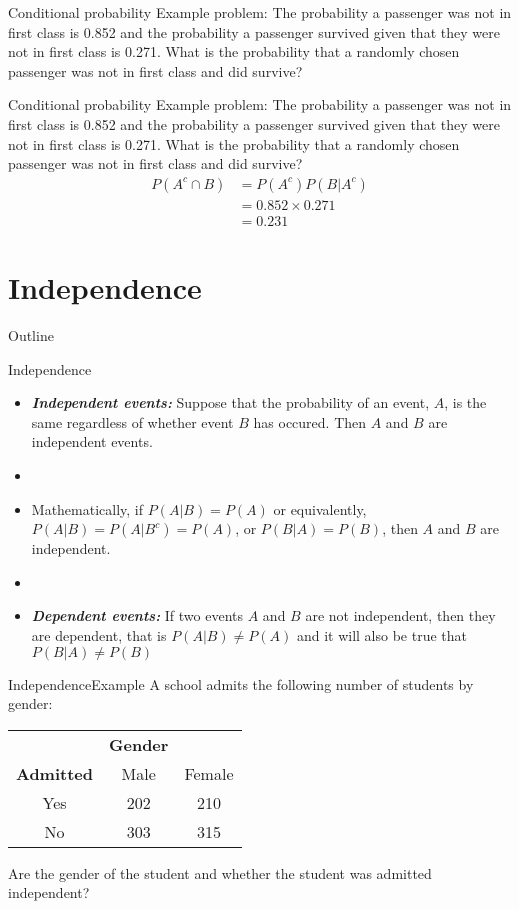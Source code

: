 \documentclass[xcolor=dvipsnames]{beamer}
\begin{document}
\begin{frame}{Conditional probability}
Example problem: The probability a passenger was not in first class is 0.852 and the probability a passenger survived given that they were not in first class is 0.271. What is the probability that a randomly chosen passenger was not in first class and did survive?
\end{frame}

\begin{frame}{Conditional probability}
	Example problem: The probability a passenger was not in first class is 0.852 and the probability a passenger survived given that they were not in first class is 0.271. What is the probability that a randomly chosen passenger was not in first class and did survive?
	\begin{align*}
		P(A^c \cap B) &= P(A^c) P(B|A^c) \\
		&= 0.852 \times 0.271 \\
		&= 0.231
	\end{align*}
\end{frame}

\section{Independence}
\begin{frame}{Outline}
\tableofcontents[currentsection,subsectionstyle=show/shaded/hide]
\end{frame}

\begin{frame}{Independence}
	\begin{itemize}
		\item \textbf{\emph{Independent events:}} Suppose that the probability of an event, $A$, is the same regardless of whether event $B$ has occured. Then $A$ and $B$ are independent events.
		\item[]
		\item Mathematically, if $P(A|B) = P(A)$ or equivalently, $P(A|B) = P(A|B^c) = P(A)$, or $P(B|A) = P(B)$, then $A$ and $B$ are independent.  
		\item[]
		\item \textbf{\emph{Dependent events:}} If two events $A$ and $B$ are not independent, then they are dependent, that is $P(A|B) \neq P(A)$ and it will also be true that $P(B|A) \neq P(B)$
	\end{itemize}
\end{frame}

\begin{frame}{Independence}{Example}
A school admits the following number of students by gender:
\begin{center}
		\begin{tabular}{c|cc}
		& \textbf{Gender} & \\
		\textbf{Admitted} & Male & Female \\ \hline
		Yes & 202 & 210 \\
		No & 303 & 315
	\end{tabular}
\end{center}
Are the gender of the student and whether the student was admitted independent?
\end{frame}
\end{document}
